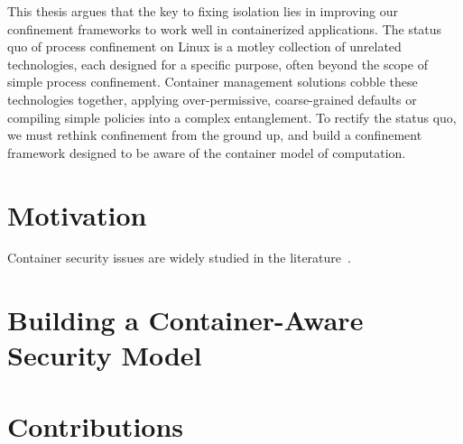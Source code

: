 \begin{inprogress}
This thesis argues that the key to fixing isolation lies in improving our confinement
frameworks to work well in containerized applications. The status quo of process
confinement on Linux is a motley collection of unrelated technologies, each designed for
a specific purpose, often beyond the scope of simple process confinement. Container
management solutions cobble these technologies together, applying over-permissive,
coarse-grained defaults or compiling simple policies into a complex entanglement. To
rectify the status quo, we must rethink confinement from the ground up, and build
a confinement framework designed to be aware of the container model of computation.
\end{inprogress}


\section{Motivation}%
\label{s:motivation}

\begin{inprogress}
Container security issues are widely studied in the literature~.
\end{inprogress}


\section{Building a Container-Aware Security Model}%
\label{s:container-aware}


\section{Contributions}%
\label{s:contributions}
